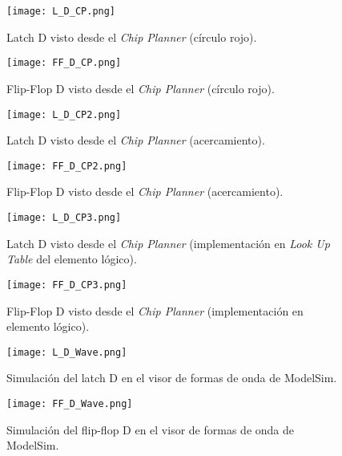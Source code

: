 \begin{figure}[ht]
	\centering
	\texttt{[image: L\_D\_CP.png]}
	\caption{Latch D visto desde el \textit{Chip Planner} (círculo rojo). \label{fig:L_D_CP}}
\end{figure}

\begin{figure}[ht]
	\centering
	\texttt{[image: FF\_D\_CP.png]}
	\caption{Flip-Flop D visto desde el \textit{Chip Planner} (círculo rojo). \label{fig:FF_D_CP}}
\end{figure}

\begin{figure}[ht]
	\centering
	\texttt{[image: L\_D\_CP2.png]}
	\caption{Latch D visto desde el \textit{Chip Planner} (acercamiento). \label{fig:L_D_CP2}}
\end{figure}

\begin{figure}[ht]
	\centering
	\texttt{[image: FF\_D\_CP2.png]}
	\caption{Flip-Flop D visto desde el \textit{Chip Planner} (acercamiento). \label{fig:FF_D_CP2}}
\end{figure}

\begin{figure}[ht]
	\centering
	\texttt{[image: L\_D\_CP3.png]}
	\caption{Latch D visto desde el \textit{Chip Planner} (implementación en \textit{Look Up Table} del elemento lógico). \label{fig:L_D_CP3}}
\end{figure}

\begin{figure}[ht]
	\centering
	\texttt{[image: FF\_D\_CP3.png]}
	\caption{Flip-Flop D visto desde el \textit{Chip Planner} (implementación en elemento lógico). \label{fig:FF_D_CP3}}
\end{figure}

\begin{figure}[ht]
	\centering
	\texttt{[image: L\_D\_Wave.png]}
	\caption{Simulación del latch D en el visor de formas de onda de ModelSim. \label{fig:L_D_Wave}}
\end{figure}

\begin{figure}[ht]
	\centering
	\texttt{[image: FF\_D\_Wave.png]}
	\caption{Simulación del flip-flop D en el visor de formas de onda de ModelSim. \label{fig:FF_D_Wave}}
\end{figure}